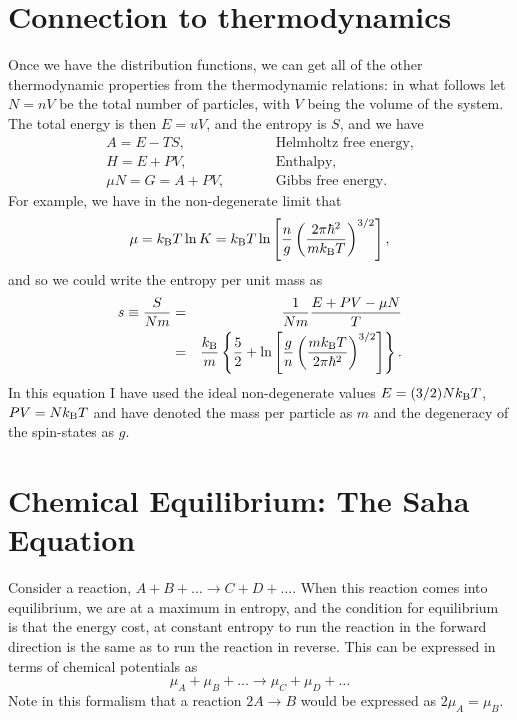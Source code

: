 \section{Connection to thermodynamics}
Once we have the distribution functions, we can get all of the other thermodynamic properties from the thermodynamic relations: in what follows let $N = nV$ be the total number of particles, with $V$ being the volume of the system.  The total energy is then $E = uV$, and the entropy is $S$, and we have
\begin{eqnarray}
A = E - TS, &\qquad& \textrm{Helmholtz free energy,}\\
H = E + PV, &\qquad& \textrm{Enthalpy,}\\
\mu N = G = A + PV, &\qquad& \textrm{Gibbs free energy}.
\end{eqnarray}
For example, we have in the non-degenerate limit that
\begin{equation}\label{e.chem-pot-ideal-gas}
\mu = k_\mathrm{B} T\ln K = k_\mathrm{B} T\ln\left[ \frac{n}{g}\left(\frac{2\pi\hbar^{2}}{mk_\mathrm{B} T}\right)^{3/2}\right],
\end{equation}
and so we could write the entropy per unit mass as
\begin{eqnarray}
s \equiv \frac{S}{Nm} &=& \frac{1}{Nm}\frac{E + PV - \mu N}{T}\nonumber\\
 &=& \frac{k_\mathrm{B} }{m}\left\{ \frac{5}{2} + \ln\left[\frac{g}{n}\left(\frac{mk_\mathrm{B} T}{2\pi\hbar^{2}}\right)^{3/2}\right]\right\}.
\label{e.sacker-tetrode}
 \end{eqnarray}
In this equation I have used the ideal non-degenerate values $E = (3/2) Nk_\mathrm{B} T$, $PV = Nk_\mathrm{B} T$ and have denoted the mass per particle as $m$ and the degeneracy of the spin-states as $g$.

\section{Chemical Equilibrium: The Saha Equation}

Consider a reaction, $A + B + \ldots \to C + D + \ldots$. When this reaction comes into equilibrium, we are at a maximum in entropy, and the condition for equilibrium is that the energy cost, at constant entropy to run the reaction in the forward direction is the same as to run the reaction in reverse. This can be expressed in terms of chemical potentials as
\begin{equation}\label{e.mass-action}
\mu_{A} + \mu_{B} + \ldots \to \mu_{C} + \mu_{D} + \ldots
\end{equation}
Note in this formalism that a reaction $2A \to B$ would be expressed as $2\mu_{A} = \mu_{B}$.

